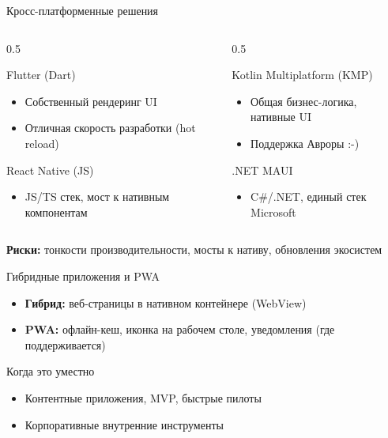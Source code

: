 \documentclass[aspectratio=169]{beamer}
\begin{document}
\begin{frame}{Кросс-платформенные решения}
  \begin{columns}[T,onlytextwidth]
    \begin{column}{0.5\textwidth}
      \begin{block}{Flutter (Dart)}
        \begin{itemize}
          \item Собственный рендеринг UI
          \item Отличная скорость разработки (hot reload)
        \end{itemize}
      \end{block}
      \begin{block}{React Native (JS)}
        \begin{itemize}
          \item JS/TS стек, мост к нативным компонентам
        \end{itemize}
      \end{block}
    \end{column}
    \begin{column}{0.5\textwidth}
      \begin{block}{Kotlin Multiplatform (KMP)}
        \begin{itemize}
          \item Общая бизнес-логика, нативные UI
          \item Поддержка Авроры :-)
        \end{itemize}
      \end{block}
      \begin{block}{.NET MAUI}
        \begin{itemize}
          \item C\#/.NET, единый стек Microsoft
        \end{itemize}
      \end{block}
    \end{column}
  \end{columns}
  \vspace{2mm}
  \textbf{Риски:} тонкости производительности, мосты к нативу, обновления экосистем
\end{frame}

\begin{frame}{Гибридные приложения и PWA}
  \begin{itemize}
    \item \textbf{Гибрид:} веб-страницы в нативном контейнере (WebView)
    \item \textbf{PWA:} офлайн-кеш, иконка на рабочем столе, уведомления (где поддерживается)
  \end{itemize}
  \begin{block}{Когда это уместно}
    \begin{itemize}
      \item Контентные приложения, MVP, быстрые пилоты
      \item Корпоративные внутренние инструменты
    \end{itemize}
  \end{block}
\end{frame}
\end{document}
